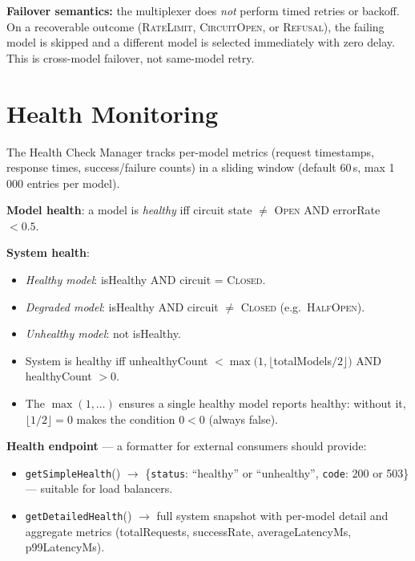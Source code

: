 \documentclass[10pt,letterpaper]{article}
\newcommand{\op}[1]{\textsc{#1}}
\newcommand{\fn}[1]{\texttt{#1}}
\begin{document}
\medskip
\noindent\textbf{Failover semantics:} the multiplexer does \emph{not} perform timed retries or backoff. On a recoverable outcome (\op{RateLimit}, \op{CircuitOpen}, or \op{Refusal}), the failing model is skipped and a different model is selected immediately with zero delay. This is cross-model failover, not same-model retry.

\section*{{\color{healthteal}Health Monitoring}}

The Health Check Manager tracks per-model metrics (request timestamps, response times, success/failure counts) in a sliding window (default 60\,s, max 1\,000 entries per model).

\smallskip
\noindent\textbf{Model health}: a model is \emph{healthy} iff circuit state $\ne$ \op{Open} AND errorRate $< 0.5$.

\smallskip
\noindent\textbf{System health}:
\begin{itemize}[nosep]
  \item \emph{Healthy model}: isHealthy AND circuit = \op{Closed}.
  \item \emph{Degraded model}: isHealthy AND circuit $\ne$ \op{Closed} (e.g.\ \op{HalfOpen}).
  \item \emph{Unhealthy model}: not isHealthy.
  \item System is healthy iff unhealthyCount $< \max(1, \lfloor$totalModels$/2\rfloor)$ AND healthyCount $> 0$.
  \item The $\max(1, \ldots)$ ensures a single healthy model reports healthy: without it, $\lfloor 1/2 \rfloor = 0$ makes the condition $0 < 0$ (always false).
\end{itemize}

\smallskip
\noindent\textbf{Health endpoint} --- a formatter for external consumers should provide:
\begin{itemize}[nosep]
  \item \fn{getSimpleHealth}() $\to$ \{\texttt{status}: ``healthy'' or ``unhealthy'', \texttt{code}: 200 or 503\} --- suitable for load balancers.
  \item \fn{getDetailedHealth}() $\to$ full system snapshot with per-model detail and aggregate metrics (totalRequests, successRate, averageLatencyMs, p99LatencyMs).
\end{itemize}
\end{document}
